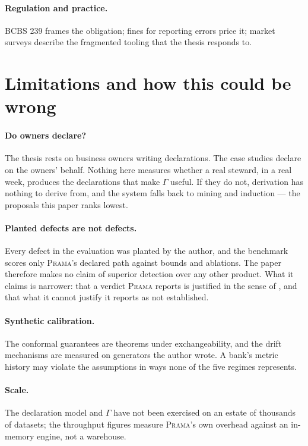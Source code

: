 \documentclass[11pt,a4paper]{article}
\renewcommand{\_}{\oldunderscore\allowbreak}
\theoremstyle{plain}
\theoremstyle{definition}
\theoremstyle{remark}
\newcommand{\Gam}{\Gamma}
\begin{document}
\paragraph{Regulation and practice.} BCBS 239 \cite{bcbs239} frames the obligation; fines for reporting
errors \cite{ateam2024} price it; market surveys \cite{gartner2025adq,datakitchen2026,dqframeworks} describe the
fragmented tooling that the thesis responds to.

\section{Limitations and how this could be wrong}\label{sec:limits}

\paragraph{Do owners declare?} The thesis rests on business owners writing declarations. The case studies
declare on the owners' behalf. Nothing here measures whether a real steward, in a real week, produces the
declarations that make $\Gam$ useful. If they do not, derivation has nothing to derive from, and the system
falls back to mining and induction --- the proposals this paper ranks lowest.

\paragraph{Planted defects are not defects.} Every defect in the evaluation was planted by the author, and the
benchmark scores only \textsc{Prama}'s declared path against bounds and ablations. The paper therefore makes
no claim of superior detection over any other product. What it
claims is narrower: that a verdict \textsc{Prama} reports is justified in the sense of , and that
what it cannot justify it reports as not established.

\paragraph{Synthetic calibration.} The conformal guarantees are theorems under exchangeability, and the drift
mechanisms are measured on generators the author wrote. A bank's metric history may violate the assumptions in
ways none of the five regimes represents.

\paragraph{Scale.} The declaration model and $\Gam$ have not been exercised on an estate of thousands of
datasets; the throughput figures measure \textsc{Prama}'s own overhead against an in-memory engine, not a
warehouse.
\end{document}
